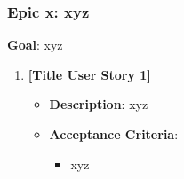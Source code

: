 \subsubsection{Epic x: xyz}
\textbf{Goal}: xyz
\begin{enumerate}
    \item \textbf{[Title User Story 1]}
    \begin{itemize}
        \item \textbf{Description}: xyz
        \item \textbf{Acceptance Criteria}:
        \begin{itemize}
            \item xyz
        \end{itemize}
    \end{itemize}
\end{enumerate}
